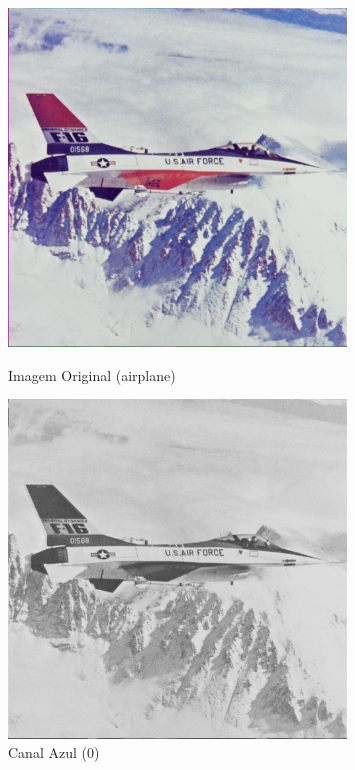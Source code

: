 \documentclass[a4paper, 11pt, portuguese]{article}
\begin{document}
\begin{figure}[htbp]
\centering
\begin{minipage}{0.48\textwidth}
    \centering
    \includegraphics[width=0.8\textwidth]{imagens/airplane.png} %
    \caption*{Imagem Original (airplane)}
\end{minipage}
\hfill
\begin{minipage}{0.48\textwidth}
    \centering
    \includegraphics[width=0.8\textwidth]{imagens/airplane_extract_0.png}
    \caption*{Canal Azul (0)}
\end{minipage}

\end{figure}
\end{document}
